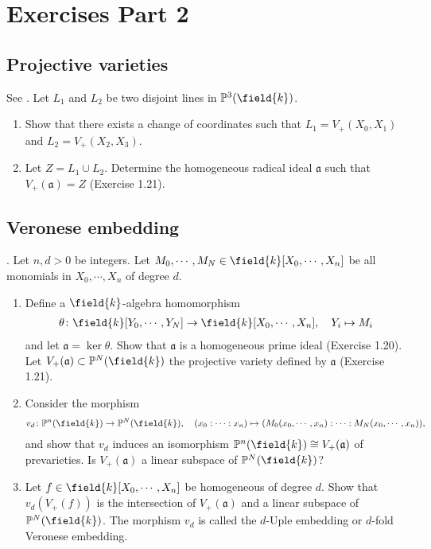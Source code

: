 \chapter{Exercises Part 2}

\section{Projective varieties}

\begin{exercise}
  See \cite[Exercise 1.22]{görtz2010algebraic}.
  Let $L_1$ and $L_2$ be two disjoint lines in
  $\mathbb{P}^3(\field{k})$.
  \begin{enumerate}[label=(\roman*)]
  \item Show that there exists a change of coordinates such that $L_1 =
    V_+(X_0,X_1)$ and $L_2 = V_+(X_2,X_3)$.
  \item Let $Z = L_1 \cup L_2$. Determine the homogeneous radical ideal $\mathfrak{a}$ such that $V_+(\mathfrak{a})=Z$ (Exercise 1.21).
  \end{enumerate}
\end{exercise}

\section{Veronese embedding}

\begin{exercise}
  \cite[Exercise 1.30]{görtz2010algebraic}.
  Let $n, d > 0$ be integers. Let $M_0,\cdots ,M_N \in
  \field{k}[X_0,\cdots ,X_n]$ be all monomials in $X_0,\cdots ,X_n$ of
  degree $d$.
  \begin{enumerate}[label=(\roman*)]
  \item Define a $\field{k}$-algebra homomorphism
    \begin{align*}
      \theta \colon
      \field{k}[Y_0,\cdots,Y_N ] \rightarrow
      \field{k}[X_0,\cdots,X_n], \quad Y_i\mapsto  M_i
    \end{align*}
   and let $\mathfrak{a} =\ker \theta$. Show that $\mathfrak{a}$ is a
   homogeneous prime ideal (Exercise 1.20). Let
   $V_+(\mathfrak{a})\subset \mathbb{P}^N (\field{k})$ the projective
   variety defined by $\mathfrak{a}$ (Exercise 1.21).
 \item Consider the morphism
   \begin{align*}
     v_d \colon \mathbb{P}^n(\field{k}) \rightarrow \mathbb{P}^N
     (\field{k}),\quad(x_0 : \cdots : x_n) \mapsto
     (M_0(x_0,\cdots,x_n):\cdots : M_N (x_0,\cdots,x_n)),
   \end{align*}
   and show that $v_d$ induces an isomorphism $\mathbb{P}^n(\field{k})
   \cong V_+(\mathfrak{a})$ of prevarieties. Is $V_+(\mathfrak{a})$ a
   linear subspace of $\mathbb{P}^N (\field{k})$?
   \item Let $f \in \field{k}[X_0,\cdots ,X_n]$ be homogeneous of degree $d$. Show that $v_d(V_+(f ))$ is the intersection of $V_+(\mathfrak{a})$ and a linear subspace of $\mathbb{P}^N (\field{k})$. The morphism $v_d$ is called the $d$-Uple embedding or $d$-fold Veronese embedding.
  \end{enumerate}
\end{exercise}

